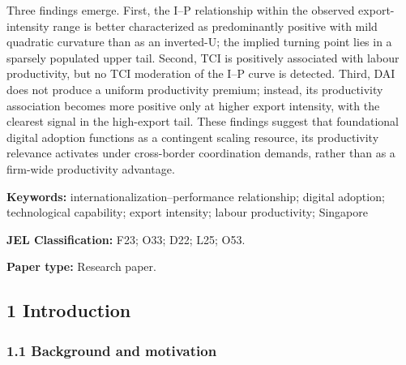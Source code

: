 \documentclass[12pt,a4paper]{article}
\begin{document}
Three findings emerge. First, the I--P relationship within the observed
export-intensity range is better characterized as predominantly positive
with mild quadratic curvature than as an inverted-U; the implied turning
point lies in a sparsely populated upper tail. Second, TCI is positively
associated with labour productivity, but no TCI moderation of the I--P
curve is detected. Third, DAI does not produce a uniform productivity
premium; instead, its productivity association becomes more positive
only at higher export intensity, with the clearest signal in the
high-export tail. These findings suggest that foundational digital
adoption functions as a contingent scaling resource, its productivity
relevance activates under cross-border coordination demands, rather than
as a firm-wide productivity advantage.

\textbf{Keywords:} internationalization--performance relationship;
digital adoption; technological capability; export intensity; labour
productivity; Singapore

\textbf{JEL Classification:} F23; O33; D22; L25; O53.

\textbf{Paper type:} Research paper.

\hypertarget{1-introduction}{%
\subsection{1 Introduction}\label{1-introduction}}

\hypertarget{11-background-and-motivation}{%
\subsubsection{1.1 Background and
motivation}\label{11-background-and-motivation}}
\end{document}
